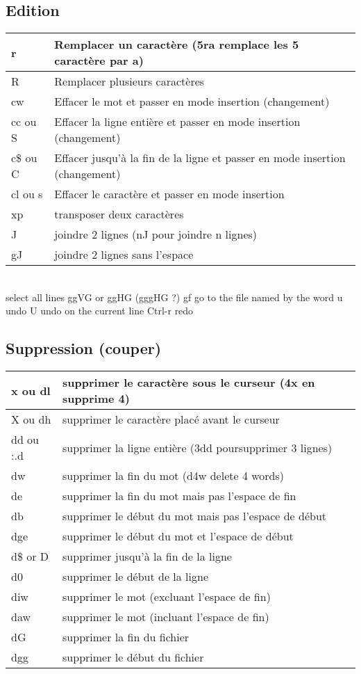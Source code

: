 \documentclass{article}
\begin{document}
\subsection{Edition}
\begin{tabular}{|p{3cm}| l| }
\hline
r & Remplacer un caractère (5ra remplace les 5 caractère par a)\\ \hline
R & Remplacer plusieurs caractères\\ \hline
cw & Effacer le mot et passer en mode insertion (changement)\\ \hline
cc ou S & Effacer la ligne entière et passer en mode insertion (changement)\\ \hline
c\$ ou C & Effacer jusqu'à la fin de la ligne et passer en mode insertion (changement)\\ \hline
cl ou s & Effacer le caractère et passer en mode insertion \\ \hline
xp & transposer deux caractères\\ \hline
J & joindre 2 lignes (nJ pour joindre n lignes)\\ \hline
gJ &joindre 2 lignes sans l'espace\\ \hline
\end{tabular}\\

select all lines ggVG or ggHG (gggHG ?)
gf go to the file named by the word
u undo
U undo on the current line
Ctrl-r redo
    
\subsection{Suppression (couper)}
\begin{tabular}{|p{3cm}| l| }\hline
x ou dl & supprimer le caractère sous le curseur (4x en supprime 4)\\ \hline
X ou dh & supprimer le caractère placé avant le curseur\\ \hline
dd ou :.d & supprimer la ligne entière (3dd poursupprimer 3 lignes)\\ \hline
dw & supprimer la fin du mot (d4w delete 4 words)\\ \hline
de & supprimer la fin du mot mais pas l'espace de fin \\ \hline
db & supprimer le début du mot mais pas l'espace de début\\ \hline
dge & supprimer le début du mot et l'espace de début\\ \hline
d\$ or D & supprimer jusqu'à la fin de la ligne\\ \hline
d0 & supprimer le début de la ligne\\ \hline
diw & supprimer le mot (excluant l'espace de fin)\\ \hline
daw & supprimer le mot (incluant l'espace de fin)\\ \hline
dG & supprimer la fin du fichier\\ \hline
dgg & supprimer le début du fichier\\ \hline
\end{tabular}\\
\end{document}
